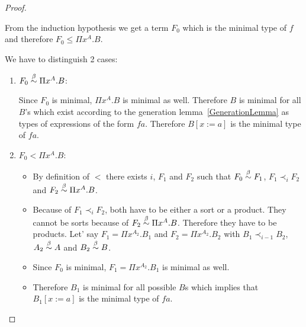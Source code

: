 \begin{theorem}
\begin{proof}
\begin{enumerate}
\begin{enumerate}
                    From the induction hypothesis we get a term $F_0$ which is
                    the minimal type of $f$ and therefore $F_0 \le \Pi x^A. B$.

                    We have to distinguish 2 cases:
                    \begin{enumerate}
                        \item $F_0 \stackrel{\beta}{\sim} \Pi x^A. B$:

                            Since $F_0$ is minimal, $\Pi x^A. B$ is minimal as
                            well. Therefore $B$ is minimal for all $B$'s which
                            exist according to the generation
                            lemma~\ref{GenerationLemma} as types of expressions
                            of the form $f a$. Therefore $B[x:=a]$ is the
                            minimal type of $f a$.

                        \item $F_0 < \Pi x^A. B$:
                        \begin{itemize}
                            \item By definition of $<$ there exists $i$, $F_1$
                                and $F_2$ such that $F_0 \stackrel{\beta}{\sim} F_1$, $F_1
                                \prec_i F_2$ and $F_2 \stackrel{\beta}{\sim} \Pi x^A. B$.

                            \item Because of $F_1 \prec_i F_2$, both have to be
                                either a sort or a product. They cannot be sorts
                                because of $F_2 \stackrel{\beta}{\sim} \Pi x^A.B$. Therefore
                                they have to be products. Let' say $F_1 = \Pi
                                x^{A_2}. B_1$ and $F_2 = \Pi x^{A_2}. B_2$
                                with $B_1 \prec_{i-1} B_2$, $A_2 \stackrel{\beta}{\sim} A$ and
                                $B_2 \stackrel{\beta}{\sim} B$.

                            \item Since $F_0$ is minimal, $F_1 = \Pi x^{A_2}.
                                B_1$ is minimal as well.

                            \item Therefore $B_1$ is minimal for all possible
                                $B$s which implies that $B_1[x:=a]$ is the
                                minimal type of $f a$.
                        \end{itemize}
                    \end{enumerate}


\end{enumerate}
\end{enumerate}
\end{proof}
\end{theorem}
